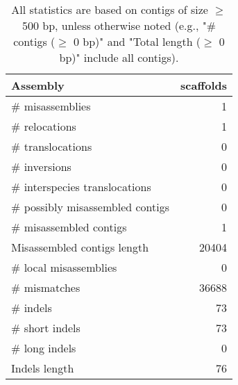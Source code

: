 \documentclass[12pt,a4paper]{article}
\begin{document}
\begin{table}[ht]
\begin{center}
\caption{All statistics are based on contigs of size $\geq$ 500 bp, unless otherwise noted (e.g., "\# contigs ($\geq$ 0 bp)" and "Total length ($\geq$ 0 bp)" include all contigs).}
\begin{tabular}{|l*{1}{|r}|}
\hline
Assembly & scaffolds \\ \hline
\# misassemblies & 1 \\ \hline
\hspace{5mm}\# relocations & 1 \\ \hline
\hspace{5mm}\# translocations & 0 \\ \hline
\hspace{5mm}\# inversions & 0 \\ \hline
\hspace{5mm}\# interspecies translocations & 0 \\ \hline
\# possibly misassembled contigs & 0 \\ \hline
\# misassembled contigs & 1 \\ \hline
Misassembled contigs length & 20404 \\ \hline
\# local misassemblies & 0 \\ \hline
\# mismatches & 36688 \\ \hline
\# indels & 73 \\ \hline
\hspace{5mm}\# short indels & 73 \\ \hline
\hspace{5mm}\# long indels & 0 \\ \hline
Indels length & 76 \\ \hline
\end{tabular}
\end{center}
\end{table}
\end{document}
